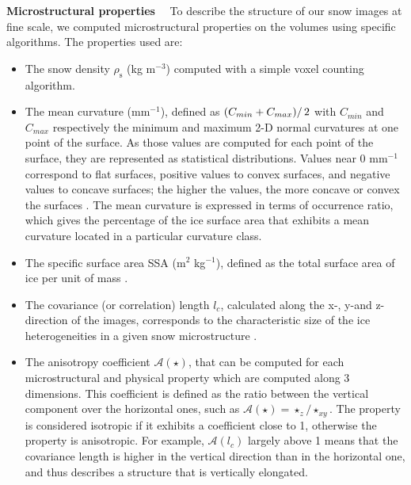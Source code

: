 \documentclass[draft,ms]{agujournal2019}
\begin{document}
\noindent \textbf{Microstructural properties}$\quad$ To describe the structure of our snow images at fine scale, we computed microstructural properties on the volumes using specific algorithms. The properties used are:
\begin{itemize}
    \item The snow density $\rho_{\mathrm{s}}$ (kg m$^{-3}$) computed with a simple voxel counting algorithm.
    
    \item The mean curvature (mm$^{-1}$), defined as $\left(C_{min} + C_{max})\right/2$ with $C_{min}$ and $C_{max}$ respectively the minimum and maximum 2-D normal curvatures at one point of the surface. As those values are computed for each point of the surface, they are represented as statistical distributions. Values near 0 mm$^{-1}$ correspond to flat surfaces, positive values to convex surfaces, and negative values to concave surfaces; the higher the values, the more concave or convex the surfaces \cite{ogawa2006representation}. The mean curvature is expressed in terms of occurrence ratio, which gives the percentage of the ice surface area that exhibits a mean curvature located in a particular curvature class.
    
    \item The specific surface area SSA (m$^2$ kg$^{-1}$), defined as the total surface area of ice per unit of mass \cite{dumont2021experimental, flin2011computations}.
    
    \item  The covariance (or correlation) length $l_{c}$, calculated along the x-, y-and z- direction of the images, corresponds to the characteristic size of the ice heterogeneities in a given snow microstructure \cite{lowe2013general}. 
    
    \item The anisotropy coefficient
    $\mathcal{A}(\star)$, that can be computed for each microstructural and physical property which are computed along 3 dimensions. This coefficient is defined as the ratio between the vertical component over the horizontal ones, such as $\mathcal{A}(\star)=\star_{z} / \star_{x y}$. The property is considered isotropic if it exhibits a coefficient close to 1, otherwise the property is anisotropic. For example, $\mathcal{A}(l_c)$ largely above 1 means that the covariance length is higher in the vertical direction than in the horizontal one, and thus describes a structure that is vertically elongated.
\end{itemize}
\end{document}

